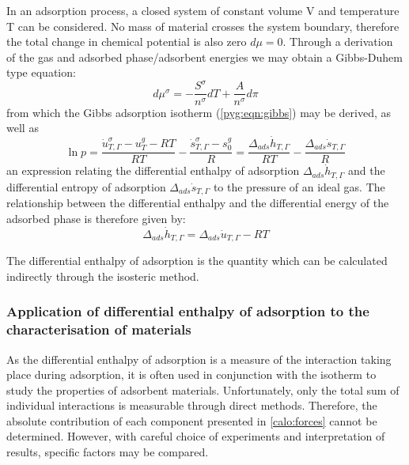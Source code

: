 In an adsorption process, a closed system of constant volume
V and temperature T can be considered. 
No mass of material crosses the system boundary,
therefore the total change in chemical potential is also
zero \(d\mu = 0\). Through
a derivation~\cite{rouquerolAdsorptionPowdersPorous2013} of the
gas and adsorbed phase/adsorbent energies we may obtain a
Gibbs-Duhem type equation:
%
\begin{equation}
	d \mu^{\sigma} = - \frac{S^{\sigma}}{n^{\sigma}} dT + \frac{A}{n^{\sigma}} d \pi
\end{equation}
%
from which the Gibbs adsorption isotherm (\autoref{pyg:eqn:gibbs}) may
be derived, as well as
%
\begin{equation}\label{calo:eqn:enthalpy}
	\ln p = \frac{\dot{u}_{T, \Gamma}^{\sigma} - u_T^g - RT}{RT} %
	- \frac{\dot{s}_{T, \Gamma}^{\sigma} - s^{g}_{0}}{R} %
	= \frac{\Delta_{ads} \dot{h}_{T, \Gamma}}{RT} - \frac{\Delta_{ads} \dot{s}_{T, \Gamma}}{R}
\end{equation}
%
an expression relating the differential enthalpy of adsorption
\(\Delta_{ads} \dot{h}_{T, \Gamma}\) and
the differential entropy of adsorption \(\Delta_{ads} \dot{s}_{T, \Gamma}\)
to the pressure of an ideal gas.
The relationship between the differential enthalpy and the differential energy
of the adsorbed phase is therefore given by:
%
\begin{equation}\label{calo:eqn:adj}
	\Delta_{ads} \dot{h}_{T, \Gamma} = \Delta_{ads} \dot{u}_{T, \Gamma} - RT
\end{equation}

The differential enthalpy of adsorption is the quantity which
can be calculated indirectly through the isosteric method.

\subsubsection{Application of differential enthalpy of adsorption to the characterisation of materials}

As the differential enthalpy of adsorption is a measure
of the interaction taking place during adsorption, it is often
used in conjunction with the isotherm to study the properties
of adsorbent materials.
Unfortunately, only the total sum of individual interactions
is measurable through direct methods. Therefore, the
absolute contribution of each component presented in
\autoref{calo:forces} cannot be determined.
However, with careful choice of experiments and interpretation
of results, specific factors may be compared.

